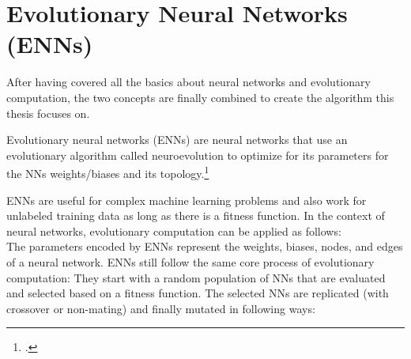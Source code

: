 \documentclass[11pt]{report}
\newcommand{\mydeflabel}{}
\newenvironment{mydef}[1]
{\renewcommand\mydeflabel{#1}\begin{mydefinner}}
{\end{mydefinner}}
\begin{document}
    \section{Evolutionary Neural Networks (ENNs)}\label{sec:evolutionary-neural-networks-(enns)}
    After having covered all the basics about neural networks and evolutionary computation, the two concepts are finally combined to create the algorithm this thesis focuses on.
    \begin{mydef}{Evolutionary Neural Networks}
        Evolutionary neural networks (ENNs) are neural networks that use an evolutionary algorithm called neuroevolution to optimize for its parameters for the NNs weights/biases and its topology.\footcite{enn22, neuroevolution19}
    \end{mydef}
    ENNs are useful for complex machine learning problems and also work for unlabeled training data as long as there is a fitness function.
    In the context of neural networks, evolutionary computation can be applied as follows:
    \\
    The parameters encoded by ENNs represent the weights, biases, nodes, and edges of a neural network.
    ENNs still follow the same core process of evolutionary computation:
    They start with a random population of NNs that are evaluated and selected based on a fitness function.
    The selected NNs are replicated (with crossover or non-mating) and finally mutated in following ways:
\end{document}
